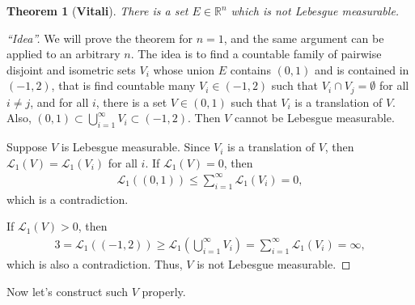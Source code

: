 \documentclass[11pt]{book}
\newtheorem{theorem}{Theorem}[chapter]
\theoremstyle{definition}
\numberwithin{equation}{chapter}
\def\L{{\mathcal L}}
\begin{document}
\begin{theorem}[\bf Vitali]\label{Vitali_theorem}
There is a set $E \in \mathbb{R}^n$ which is not Lebesgue measurable.
\end{theorem}
\begin{proof}[``Idea'']
We will prove the theorem for $n = 1$, and the same argument can be applied to an arbitrary $n$. The idea is to find a countable family of pairwise disjoint and isometric sets $V_i$ whose union $E$ contains $(0,1)$ and is contained in $(-1,2)$, that is find countable many $V_i \in (-1,2)$ such that $V_i \cap V_j = \emptyset$ for all $i \neq j$, and for all $i$, there is a set $V \in (0,1)$ such that $V_i$ is a translation of $V$. Also, $(0,1) \subset \bigcup^\infty_{i=1} V_i \subset (-1,2)$. Then $V$ cannot be Lebesgue measurable.

Suppose $V$ is Lebesgue measurable. Since $V_i$ is a translation of $V$, then $\L_1(V) = \L_1(V_i)$ for all $i$. If $\L_1(V) = 0$, then
\begin{align*}
    \L_1((0,1)) \leq \sum^\infty_{i=1} \L_1(V_i) = 0,
\end{align*}
which is a contradiction.

If $\L_1(V) > 0$, then
\begin{align*}
    3 = \L_1((-1,2)) \geq \L_1\left(\bigcup^\infty_{i=1} V_i\right) = \sum^\infty_{i=1} \L_1(V_i) = \infty,
\end{align*}
which is also a contradiction. Thus, $V$ is not Lebesgue measurable.
\end{proof}

\medskip

Now let's construct such $V$ properly.

\medskip
\end{document}
